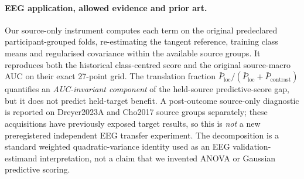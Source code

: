 \paragraph{EEG application, allowed evidence and prior art.}
Our source-only instrument computes each term on the
original predeclared participant-grouped folds,
re-estimating the tangent reference, training class
means and regularised covariance within the available
source groups. It reproduces both the historical
class-centred score and the original source-macro AUC
on their exact 27-point grid.
The translation fraction
$\bar P_{\mathrm{loc}}/
(\bar P_{\mathrm{loc}}+\bar P_{\mathrm{contrast}})$
quantifies an \emph{AUC-invariant component} of the
held-source predictive-score gap, but it does
not predict held-target benefit.
A post-outcome source-only diagnostic is reported on
Dreyer2023A and Cho2017 source groups separately;
these acquisitions have previously exposed target
results, so this is \emph{not} a new preregistered
independent EEG transfer experiment.
The decomposition is a standard weighted
quadratic-variance identity used as an
EEG validation-estimand interpretation,
not a claim that we invented ANOVA or Gaussian
predictive scoring.
